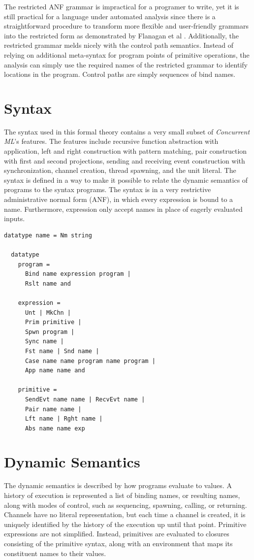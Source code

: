 \documentclass[10pt]{article}
\begin{document}
The restricted ANF grammar is impractical
for a programer to write, yet it is still practical for
a language under automated analysis since there is a straightforward procedure to transform
more flexible and user-friendly grammars into the
restricted form as demonstrated by Flanagan et al \cite{}.
Additionally, the restricted grammar melds nicely with the control path semantics.
Instead of relying on additional meta-syntax for program points of primitive operations,
the analysis 
can simply use the required names of the restricted grammar to identify
locations in the program.
Control paths are simply sequences of bind names.

\section{Syntax}
The syntax used in this formal theory contains a very small subset of
\textit{Concurrent ML}'s features. The features include recursive function abstraction with
application, left and right construction with pattern matching, pair construction with first
and second projections, sending and receiving event construction with synchronization,
channel creation, thread spawning, and the unit literal. The syntax is defined in a way to
make it possible to relate the dynamic semantics of programs to the syntax programs.
The syntax is in a very restrictive administrative normal form (ANF), in which every expression
is bound to a name. Furthermore, expression only accept names in place of eagerly evaluated
inputs. 

\begin{lstlisting}[language=logic]
  datatype name = Nm string

  datatype 
    program = 
      Bind name expression program |
      Rslt name and 

    expression = 
      Unt | MkChn |
      Prim primitive |
      Spwn program |
      Sync name |
      Fst name | Snd name |
      Case name name program name program |
      App name name and 

    primitive = 
      SendEvt name name | RecvEvt name |
      Pair name name |
      Lft name | Rght name |
      Abs name name exp
  \end{lstlisting}

\section{Dynamic Semantics}
The dynamic semantics is described by how programs evaluate to values.
A history of execution is
represented a list of binding names, or resulting names, along with modes of control, such as
sequencing, spawning, calling, or returning. Channels have no literal representation, but each
time a channel is created, it is uniquely identified by the history of the execution up until
that point. Primitive expressions are not simplified.  Instead, primitives are evaluated to
closures consisting of the primitive syntax, along with an environment that maps its
constituent names to their values.
\end{document}
